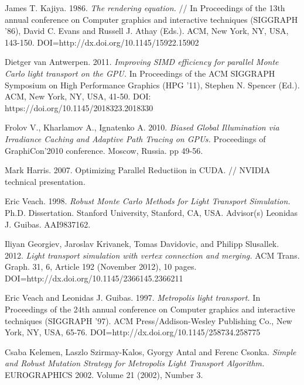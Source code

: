 \documentclass[twoside,twocolumn,10pt]{article}
\begin{document}

\begin{thebibliography}{99}
\label{references}
 James T. Kajiya. 1986. \textit{The rendering equation.} // In Proceedings of the 13th annual conference on Computer graphics and interactive techniques (SIGGRAPH '86), David C. Evans and Russell J. Athay (Eds.). ACM, New York, NY, USA, 143-150. DOI=http://dx.doi.org/10.1145/15922.15902

 Dietger van Antwerpen. 2011. \textit{Improving SIMD efficiency for parallel Monte Carlo light transport on the GPU.} In Proceedings of the ACM SIGGRAPH Symposium on High Performance Graphics (HPG '11), Stephen N. Spencer (Ed.). ACM, New York, NY, USA, 41-50. DOI: https://doi.org/10.1145/2018323.2018330 

 Frolov V., Kharlamov A., Ignatenko A. 2010. \textit{Biased Global Illumination via Irradiance Caching and Adaptive Path Tracing on GPUs.} Proceedings of GraphiCon'2010 conference. Moscow, Russia. pp 49-56.

 Mark Harris. 2007. Optimizing Parallel Reductiion in CUDA. // NVIDIA technical presentation.

 Eric Veach. 1998. \textit{Robust Monte Carlo Methods for Light Transport Simulation.} Ph.D. Dissertation. Stanford University, Stanford, CA, USA. Advisor(s) Leonidas J. Guibas. AAI9837162. 

 Iliyan Georgiev, Jaroslav Krivanek, Tomas Davidovic, and Philipp Slusallek. 2012. \textit{Light transport simulation with vertex connection and merging.} ACM Trans. Graph. 31, 6, Article 192 (November 2012), 10 pages. DOI=http://dx.doi.org/10.1145/2366145.2366211 

 Eric Veach and Leonidas J. Guibas. 1997. \textit{Metropolis light transport.} In Proceedings of the 24th annual conference on Computer graphics and interactive techniques (SIGGRAPH '97). ACM Press/Addison-Wesley Publishing Co., New York, NY, USA, 65-76. DOI=http://dx.doi.org/10.1145/258734.258775 

 Csaba Kelemen, Laszlo Szirmay-Kalos, Gyorgy Antal and Ferenc Csonka. \textit{Simple and Robust Mutation Strategy for Metropolis Light Transport Algorithm.} EUROGRAPHICS 2002. Volume 21 (2002), Number 3.


\end{thebibliography}
\end{document}
